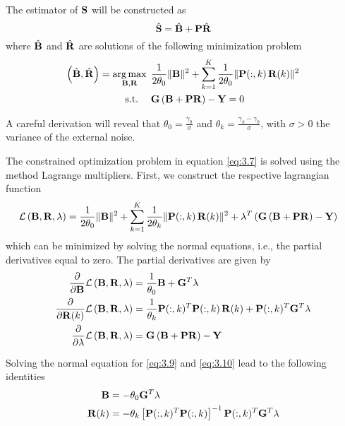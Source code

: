 The estimator of $\mathbf{S}$ will be constructed as 
\begin{equation}
    \hat{\mathbf{S}} = \hat{\mathbf{B}} + \mathbf{P} \hat{\mathbf{R}}
\end{equation}
where $\hat{\mathbf{B}}$ and $\hat{\mathbf{R}}$ are solutions of the following minimization problem
\begin{align}
    \left(  \hat{\mathbf{B}}, \hat{\mathbf{R}}  \right) 
    =
    \operatorname*{arg\,max}_{\mathbf{B}, \mathbf{R} }\, 
    &\phantom{.}
    \frac{1}{2 \theta_0} \lVert \mathbf{B} \rVert^2
    +
    \sum_{k=1}^K \frac{1}{2 \theta_0} \lVert \mathbf{P}(:,k)\, \mathbf{R}(k) \rVert^2
    \nonumber \\
    \text{s.t.}
    \quad
    &\phantom{.}
    {\mathbf{G} \left( \mathbf{B} + \mathbf{P} \mathbf{R} \right) } - \mathbf{Y} = 0
    \label{eq:3.7}
\end{align}

A careful derivation will reveal that $\theta_0 = \frac{\gamma_0 }{\sigma}$ and $\theta_k = \frac{\gamma_k-\gamma_0}{\sigma}$, with $\sigma>0$ the variance of the external noise.
%

The constrained optimization problem in equation \eqref{eq:3.7} is solved using the method Lagrange multipliers.
%
First, we construct the respective lagrangian function
\begin{align}
    \mathcal{L}\left( \mathbf{B}, \mathbf{R}, \lambda \right) &=
    \frac{1}{2 \theta_0} \lVert \mathbf{B} \rVert^2
    +
    \sum_{k=1}^K \frac{1}{2 \theta_k} \lVert \mathbf{P}(:,k)\, \mathbf{R}(k) \rVert^2
    +
    \lambda^T \left( {\mathbf{G} \left( \mathbf{B} + \mathbf{P} \mathbf{R} \right) } - \mathbf{Y} \right)
\end{align}
which can be minimized by solving the normal equations, i.e., the partial derivatives equal to zero.
%
The partial derivatives are given by
\begin{align}
    \frac{\partial}{\partial \mathbf{B}} \mathcal{L}\left( \mathbf{B}, \mathbf{R}, \lambda \right)
    &=
    \frac{1}{\theta_0} \mathbf{B} + \mathbf{G}^T \lambda 
    \label{eq:3.9}
    \\
    \frac{\partial}{\partial \mathbf{R}(k)} \mathcal{L}\left( \mathbf{B}, \mathbf{R}, \lambda \right)
    &=
    \frac{1}{\theta_k} \mathbf{P}(:,k)^T \mathbf{P}(:,k)\, \mathbf{R}(k) + \mathbf{P}(:,k)^T \mathbf{G}^T \lambda 
    \label{eq:3.10}
    \\
    \frac{\partial}{\partial \lambda} \mathcal{L}\left( \mathbf{B}, \mathbf{R}, \lambda \right)
    &=
    \mathbf{G} \left(  \mathbf{B} + \mathbf{P} \mathbf{R}  \right) - \mathbf{Y}
    \label{eq:3.11}
\end{align}

Solving the normal equation for \eqref{eq:3.9} and \eqref{eq:3.10} lead to the following identities
\begin{align}
    \mathbf{B} &= -\theta_0 \mathbf{G}^T \lambda
    \\
    \mathbf{R}(k)
    &=
    -\theta_k \left[ \mathbf{P}(:,k)^T \mathbf{P}(:,k) \right]^{-1} \mathbf{P}(:,k)^T \mathbf{G}^T \lambda 
\end{align}

